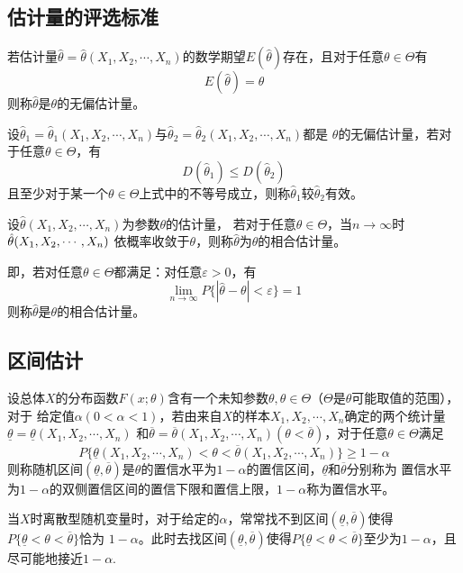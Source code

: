\subsection{估计量的评选标准}
\begin{definition}[无偏性]
    若估计量$\hat{\theta}=\hat{\theta}(X_1,X_2,\cdots,X_n)$的数学期望$E(\hat{\theta})$存在，且对于任意$\theta\in \varTheta$有
    $$E(\hat{\theta})=\theta$$
    则称$\hat{\theta}$是$\theta$的{\heiti 无偏估计量}。
\end{definition}

\begin{definition}[有效性]
    设$\hat{\theta}_1=\hat{\theta}_1(X_1,X_2,\cdots,X_n)$与$\hat{\theta}_2=\hat{\theta}_2(X_1,X_2,\cdots,X_n)$都是
    $\theta$的无偏估计量，若对于任意$\theta\in \varTheta$，有
    $$D(\hat{\theta}_1)\leq D(\hat{\theta}_2)$$
    且至少对于某一个$\theta\in \varTheta$上式中的不等号成立，则称$\hat{\theta}_1$较$\hat{\theta}_2${\heiti 有效}。
\end{definition}

\begin{definition}[相合性]
    设$\hat{\theta}(X_1,X_2,\cdots,X_n)$为参数$\theta$的估计量，
    若对于任意$\theta\in \varTheta$，当$n \to \infty$时$\hat{\theta}(X_1,\\X_2,\cdots,X_n)$
    依概率收敛于$\theta$，则称$\hat{\theta}$为$\theta$的{\heiti 相合估计量}。

    即，若对任意$\theta\in \varTheta$都满足：对任意$\varepsilon>0$，有
    $$\lim_{n\to\infty} P\{|\hat{\theta}-\theta|<\varepsilon\}=1$$
    则称$\hat{\theta}$是$\theta$的{\heiti 相合估计量}。
\end{definition}

\subsection{区间估计}
\begin{definition}[置信区间]
    设总体$X$的分布函数$F(x;\theta)$含有一个未知参数$\theta,\theta\in \varTheta$（$\varTheta$是$\theta$可能取值的范围），对于
    给定值$\alpha(0<\alpha<1)$，若由来自$X$的样本$X_1,X_2,\cdots,X_n$确定的两个统计量$\underline{\theta}=\underline{\theta}(X_1,X_2,\cdots,X_n)$
    和$\overline{\theta}=\overline{\theta}(X_1,X_2,\cdots,X_n)(\theta<\overline{\theta})$，对于任意$\theta\in\varTheta$满足
    $$P\{\underline{\theta}(X_1,X_2,\cdots,X_n)<\theta<\overline{\theta}(X_1,X_2,\cdots,X_n)\}\geq 1-\alpha$$
    则称随机区间$(\underline{\theta},\overline{\theta})$是$\theta$的置信水平为$1-\alpha$的{\heiti 置信区间}，$\underline{\theta}$和$\overline{\theta}$分别称为
    置信水平为$1-\alpha$的双侧置信区间的{\heiti 置信下限}和{\heiti 置信上限}，$1-\alpha$称为{\heiti 置信水平}。

    当$X$时离散型随机变量时，对于给定的$\alpha$，常常找不到区间$(\underline{\theta},\overline{\theta})$使得$P\{\underline{\theta}<\theta<\overline{\theta}\}$恰为
    $1-\alpha$。此时去找区间$(\underline{\theta},\overline{\theta})$使得$P\{\underline{\theta}<\theta<\overline{\theta}\}$至少为$1-\alpha$，且尽可能地接近$1-\alpha$.
\end{definition}

